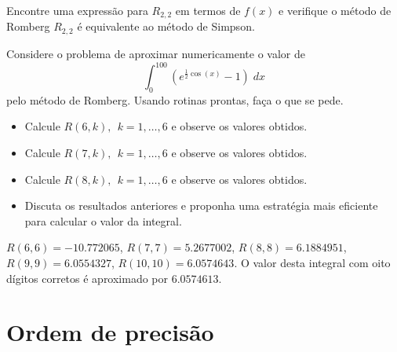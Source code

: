 \begin{exer}
Encontre uma expressão para $R_{2,2}$ em termos de $f(x)$ e verifique o método de Romberg $R_{2,2}$ é equivalente ao método de Simpson.
\end{exer}

\begin{exer}
Considere o problema de aproximar numericamente o valor de
$$\int_0^{100} \left(e^{\frac{1}{2}\cos(x)}-1\right)\;dx$$
pelo método de Romberg. Usando rotinas prontas, faça o que se pede.
\begin{itemize}
\item Calcule $R(6,k),~~ k=1,\ldots,6$ e observe os valores obtidos.
\item Calcule $R(7,k),~~ k=1,\ldots,6$ e observe os valores obtidos.
\item Calcule $R(8,k),~~ k=1,\ldots,6$ e observe os valores obtidos.
\item Discuta os resultados anteriores e proponha uma estratégia mais eficiente para calcular o valor da integral.
\end{itemize}
\end{exer}
\begin{resp}
  
 $R(6,6)=- 10.772065$, $R(7,7)=5.2677002$, $R(8,8)=6.1884951$, $R(9,9)=6.0554327$, $R(10,10)=6.0574643$. O valor desta integral com oito dígitos corretos é aproximado por  $6.0574613$.      
  
\end{resp}

\section{Ordem de precisão}

